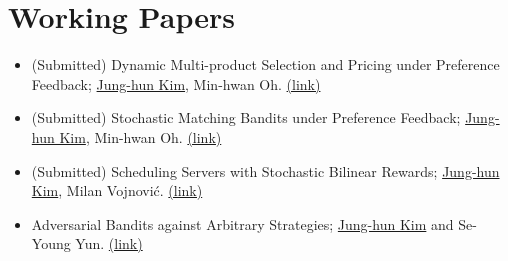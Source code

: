 \documentclass{article}
\begin{document}
\section*{Working Papers}
\begin{itemize}
    \item (Submitted) {Dynamic Multi-product Selection and Pricing under Preference Feedback}; \underline{Jung-hun Kim}, Min-hwan Oh. \href{https://openreview.net/pdf?id=DOXnqYLCcd}{(link)}
    \item  (Submitted) {Stochastic Matching Bandits under Preference Feedback}; \underline{Jung-hun Kim}, Min-hwan Oh. \href{https://openreview.net/pdf?id=iKLSISIPH7}{(link)}
    \item (Submitted) {Scheduling Servers with Stochastic Bilinear Rewards}; \underline{Jung-hun Kim}, Milan Vojnovi{\'c}. \href{https://arxiv.org/pdf/2112.06362}{(link)}
\item{Adversarial Bandits against Arbitrary Strategies}; \underline{Jung-hun Kim} and Se-Young Yun. \href{https://arxiv.org/pdf/2205.14839}{(link)}
\end{itemize}
\end{document}
